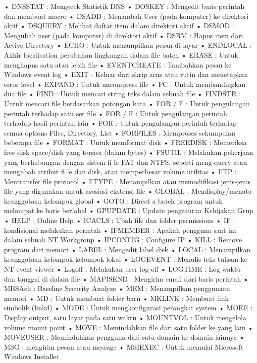 \documentclass{article}
\begin{document}
• DNSSTAT : Mengecek Statistik DNS
• DOSKEY : Mengedit baris perintah dan membuat macro
• DSADD : Menambah User (pada komputer) ke direktori aktif
• DSQUERY : Melihat daftar item dalam direktori aktif
• DSMOD : Mengubah user (pada komputer) di direktori aktif
• DSRM : Hapus item dari Active Directory
• ECHO : Untuk menampilkan pesan di layar
• ENDLOCAL : Akhir localisation  perubahan lingkungan dalam file batch
• ERASE : Untuk menghapus satu atau lebih file
• EVENTCREATE : Tambahkan pesan ke Windows event log
• EXIT : Keluar dari skrip arus atau rutin dan menetapkan error level
• EXPAND : Untuk uncompress file
• FC : Untuk membandingkan dua file
• FIND : Untuk mencari string teks dalam sebuah file
• FINDSTR : Untuk mencari file berdasarkan potongan kata
• FOR / F : Untuk pengulangan perintah terhadap satu set file
• FOR / F : Untuk pengulangan perintah terhadap hasil perintah lain
• FOR : Untuk pengulangan perintah terhadap semua options Files, Directory, List
• FORFILES : Memproses sekumpulan beberapa file
• FORMAT : Untuk memformat disk
• FREEDISK : Memeriksa free disk space/disk yang tersisa (dalam bytes)
• FSUTIL :  Melakukan pekerjaan yang berhubungan dengan sistem fi le FAT dan NTFS, seperti meng-query atau mengubah atribut fi le dan disk, atau memperbesar  volume utilitas
• FTP : Mentransfer file  protocol
• FTYPE : Menampilkan atau memodifikasi jenis-jenis file yang digunakan untuk  asosiasi ekstensi file
• GLOBAL : Mendisplay/menata keanggotaan kelompok global
• GOTO : Direct a batch program untuk melompat ke baris berlabel
• GPUPDATE : Update pengaturan Kebijakan Grup
• HELP : Online Help
• ICACLS : Ubah file dan folder permissions
• IF : kondisional melakukan perintah
• IFMEMBER : Apakah pengguna saat ini dalam sebuah NT Workgroup
• IPCONFIG : Configure IP
• KILL : Remove program dari memori
• LABEL : Mengedit label disk
• LOCAL : Menampilkan keanggotaan kelompok-kelompok lokal
• LOGEVENT : Menulis teks tulisan ke NT event viewer
• Logoff : Melakukan user log off
• LOGTIME : Log waktu dan tanggal di dalam file
• MAPISEND : Mengirim email dari baris perintah
• MBSAcli : Baseline Security Analyze
• MEM : Menampilkan penggunaan memori
• MD : Untuk membuat folder baru
• MKLINK : Membuat link simbolik (linkd)
• MODE : Untuk mengkonfigurasi perangkat system
• MORE : Display output, satu layar pada satu waktu
• MOUNTVOL : Untuk mengelola volume mount point
• MOVE : Memindahkan file dari satu folder ke yang lain
• MOVEUSER : Memindahkan pengguna dari satu domain ke domain lainnya
• MSG : mengirim pesan atau message
• MSIEXEC : Untuk memulai Microsoft Windows Installer
\end{document}
